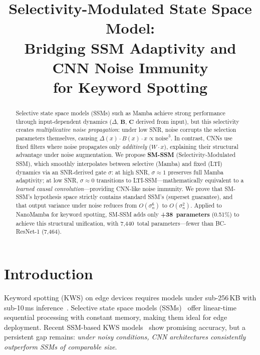 \documentclass{Interspeech}
\title{Selectivity-Modulated State Space Model:\\Bridging SSM Adaptivity and CNN Noise Immunity\\for Keyword Spotting}
\begin{document}
\maketitle

\begin{abstract}
Selective state space models (SSMs) such as Mamba achieve strong performance through input-dependent dynamics ($\Delta$, $\mathbf{B}$, $\mathbf{C}$ derived from input), but this selectivity creates \emph{multiplicative noise propagation}: under low SNR, noise corrupts the selection parameters themselves, causing $\Delta(x) \cdot B(x) \cdot x \propto \text{noise}^3$.
In contrast, CNNs use fixed filters where noise propagates only \emph{additively} ($W \cdot x$), explaining their structural advantage under noise augmentation.
We propose \textbf{SM-SSM} (Selectivity-Modulated SSM), which smoothly interpolates between selective (Mamba) and fixed (LTI) dynamics via an SNR-derived gate $\sigma$:
at high SNR, $\sigma{\approx}1$ preserves full Mamba adaptivity;
at low SNR, $\sigma{\approx}0$ transitions to LTI-SSM---mathematically equivalent to a \emph{learned causal convolution}---providing CNN-like noise immunity.
We prove that SM-SSM's hypothesis space strictly contains standard SSM's (superset guarantee), and that output variance under noise reduces from $O(\sigma_n^6)$ to $O(\sigma_n^2)$.
Applied to NanoMamba for keyword spotting, SM-SSM adds only \textbf{+38~parameters} (0.51\%) to achieve this structural unification, with 7,440~total parameters---fewer than BC-ResNet-1 (7,464).
\end{abstract}

\section{Introduction}

Keyword spotting (KWS) on edge devices requires models under sub-256\,KB with sub-10\,ms inference~\cite{banbury2021mlperf,lin2020mcunet}.
Selective state space models (SSMs)~\cite{gu2024mamba,gu2022efficiently} offer linear-time sequential processing with constant memory, making them ideal for edge deployment.
Recent SSM-based KWS models~\cite{goel2024keyword} show promising accuracy, but a persistent gap remains: \emph{under noisy conditions, CNN architectures consistently outperform SSMs of comparable size}.
\end{document}
